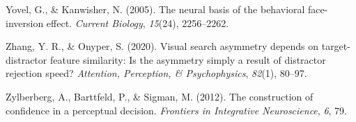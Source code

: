 \documentclass[12pt,twoside]{reedthesis}
\begin{document}
\leavevmode\hypertarget{ref-yovel2005neural}{}%
Yovel, G., \& Kanwisher, N. (2005). The neural basis of the behavioral face-inversion effect. \emph{Current Biology}, \emph{15}(24), 2256--2262.

\leavevmode\hypertarget{ref-zhang2020visual}{}%
Zhang, Y. R., \& Onyper, S. (2020). Visual search asymmetry depends on target-distractor feature similarity: Is the asymmetry simply a result of distractor rejection speed? \emph{Attention, Perception, \& Psychophysics}, \emph{82}(1), 80--97.

\leavevmode\hypertarget{ref-zylberberg2012construction}{}%
Zylberberg, A., Barttfeld, P., \& Sigman, M. (2012). The construction of confidence in a perceptual decision. \emph{Frontiers in Integrative Neuroscience}, \emph{6}, 79.


\end{document}

